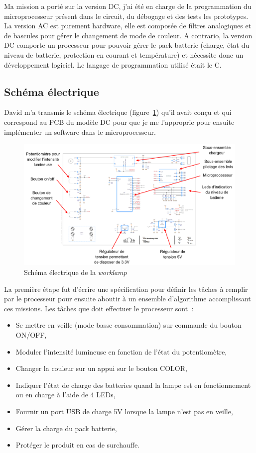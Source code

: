 \documentclass[a4paper, 12pt, sffamily]{report}
\begin{document}
Ma mission a porté sur la version DC, j’ai été en charge de la programmation du microprocesseur présent dans le circuit, du débogage et des tests les prototypes. La version AC est purement hardware, elle est composée de filtres analogiques et de bascules pour gérer le changement de mode de couleur. A contrario, la version DC comporte un processeur pour pouvoir gérer le pack batterie (charge, état du niveau de batterie, protection en courant et température) et nécessite donc un développement logiciel. Le langage de programmation utilisé était le C.

\subsection{Schéma électrique}
David m’a transmis le schéma électrique (figure~\ref{fig:worklamp_schema}) qu’il avait conçu et qui correspond au PCB du modèle DC pour que je me l’approprie pour ensuite implémenter un software dans le microprocesseur.

\begin{figure}[h]
\centering
\includegraphics[scale=0.51]{figures/screenshots/version_A3_worklamp.png}
\caption{Schéma électrique de la \emph{worklamp}}
\label{fig:worklamp_schema}
\end{figure}

La première étape fut d’écrire une spécification pour définir les tâches à remplir par le processeur pour ensuite aboutir à un ensemble d’algorithme accomplissant ces missions.
Les tâches que doit effectuer le processeur sont~:
\begin{itemize} %
\item Se mettre en veille (mode basse consommation) sur commande du bouton ON/OFF,
\item Moduler l’intensité lumineuse en fonction de l’état du potentiomètre,
\item Changer la couleur sur un appui sur le bouton COLOR,
\item Indiquer l’état de charge des batteries quand la lampe est en fonctionnement ou en charge à l’aide de 4 LEDs,
\item Fournir un port USB de charge 5V lorsque la lampe n’est pas en veille,
\item Gérer la charge du pack batterie,
\item Protéger le produit en cas de surchauffe.
\end{itemize}
\end{document}
